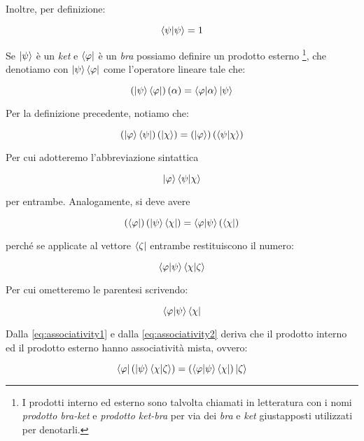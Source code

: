 Inoltre, per definizione:

	\begin{equation} \label{eq:normalizedVectors}
		\braket{\psi}{\psi} = 1
	\end{equation}

Se $\ket{\psi}$ è un \textit{ket} e $\bra{\varphi}$ è un \textit{bra} possiamo definire un prodotto esterno \footnote{I prodotti interno ed esterno sono talvolta chiamati in letteratura con i nomi \textit{prodotto bra-ket} e \textit{prodotto ket-bra} per via dei \textit{bra} e \textit{ket} giustapposti utilizzati per denotarli.}, che denotiamo con $\ket{\psi}\bra{\varphi}$ come l'operatore lineare tale che:

	\begin{equation} \label{eq:outerProduct}
		\left( \ket{\psi}\bra{\varphi} \right)(\alpha) = \braket{\varphi}{\alpha} \ket{\psi}
	\end{equation}

Per la definizione precedente, notiamo che:

	\begin{equation} \label{eq:associativity1}
		\left ( \ket{\varphi} \bra{\psi} \right ) \left ( \ket{ \chi } \right ) = \left ( \ket{\varphi} \right ) \left ( \braket{\psi}{\chi} \right )
	\end{equation}

Per cui adotteremo l'abbreviazione sintattica

	\[
		\ket{\varphi}\braket{\psi}{\chi}
	\]

per entrambe. Analogamente, si deve avere

	\begin{equation} \label{eq:associativity2}
		\left( \bra{\varphi} \right ) \left ( \ket{\psi} \bra{\chi} \right ) = \braket{\varphi}{\psi} \left (\bra{\chi} \right )
	\end{equation}

perché se applicate al vettore $\bra{\zeta}$ entrambe restituiscono il numero:
	
	\[
		\braket{\varphi}{\psi}\braket{\chi}{\zeta}
	\]

Per cui ometteremo le parentesi scrivendo:

	\[
		\braket{\varphi}{\psi}\bra{\chi}
	\]

Dalla \eqref{eq:associativity1} e dalla \eqref{eq:associativity2} deriva che il prodotto interno ed il prodotto esterno hanno associatività mista, ovvero:

	\begin{equation}
		\bra{\varphi} \left( \ket{\psi} \braket{\chi}{\zeta} \right ) =
		\left ( \braket{\varphi}{\psi} \bra{\chi} \right ) \ket{\zeta}
	\end{equation}
